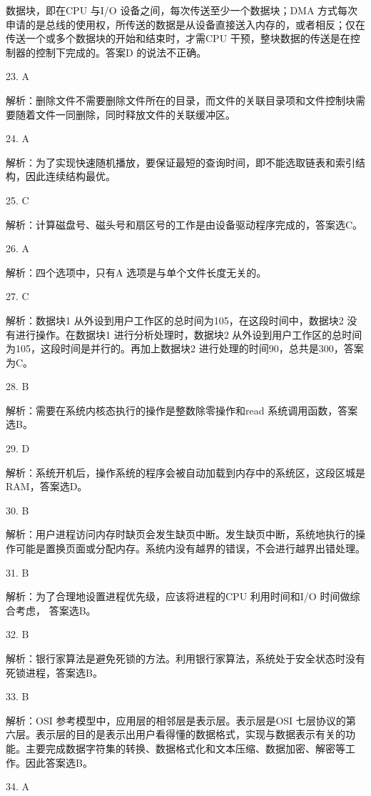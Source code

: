 \documentclass[UTF8,11pt]{ctexart}
\begin{document}
数据块，即在CPU 与I/O 设备之间，每次传送至少一个数据块；DMA 方式每次申请的是总线的使用权，所传送的数据是从设备直接送入内存的，或者相反；仅在传送一个或多个数据块的开始和结束时，才需CPU 干预，整块数据的传送是在控制器的控制下完成的。答案D 的说法不正确。


23. A


解析：删除文件不需要删除文件所在的目录，而文件的关联目录项和文件控制块需要随着文件一同删除，同时释放文件的关联缓冲区。


24. A


解析：为了实现快速随机播放，要保证最短的查询时间，即不能选取链表和索引结构，因此连续结构最优。


25. C


解析：计算磁盘号、磁头号和扇区号的工作是由设备驱动程序完成的，答案选C。


26. A


解析：四个选项中，只有A 选项是与单个文件长度无关的。


27. C


解析：数据块1 从外设到用户工作区的总时间为105，在这段时间中，数据块2 没有进行操作。在数据块1 进行分析处理时，数据块2 从外设到用户工作区的总时间为105，这段时间是并行的。再加上数据块2 进行处理的时间90，总共是300，答案为C。


28. B


解析：需要在系统内核态执行的操作是整数除零操作和read 系统调用函数，答案选B。


29. D


解析：系统开机后，操作系统的程序会被自动加载到内存中的系统区，这段区城是RAM，答案选D。


30. B


解析：用户进程访问内存时缺页会发生缺页中断。发生缺页中断，系统地执行的操作可能是置换页面或分配内存。系统内没有越界的错误，不会进行越界出错处理。


31. B


解析：为了合理地设置进程优先级，应该将进程的CPU 利用时间和I/O 时间做综合考虑， 答案选B。


32. B


解析：银行家算法是避免死锁的方法。利用银行家算法，系统处于安全状态时没有死锁进程，答案选B。


33. B


解析：OSI 参考模型中，应用层的相邻层是表示层。表示层是OSI 七层协议的第六层。表示层的目的是表示出用户看得懂的数据格式，实现与数据表示有关的功能。主要完成数据字符集的转换、数据格式化和文本压缩、数据加密、解密等工作。因此答案选B。


34. A
\end{document}

